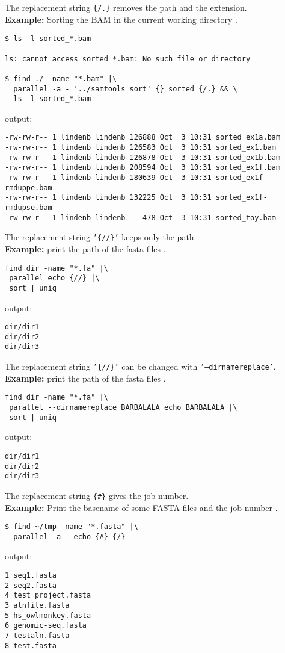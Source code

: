 \documentclass{article}
\newcommand{\example}[1]{
\textbf{Example: } {\color[rgb]{0,0,1} #1 } .
}
\begin{document}
The replacement string  \texttt{\{/.\}} removes the path and the extension.\\
\example{Sorting the BAM in the current working directory}
\begin{lstlisting}
$ ls -l sorted_*.bam

ls: cannot access sorted_*.bam: No such file or directory

$ find ./ -name "*.bam" |\
  parallel -a - '../samtools sort' {} sorted_{/.} && \
  ls -l sorted_*.bam
\end{lstlisting}
output:
\begin{lstlisting}
-rw-rw-r-- 1 lindenb lindenb 126888 Oct  3 10:31 sorted_ex1a.bam
-rw-rw-r-- 1 lindenb lindenb 126583 Oct  3 10:31 sorted_ex1.bam
-rw-rw-r-- 1 lindenb lindenb 126878 Oct  3 10:31 sorted_ex1b.bam
-rw-rw-r-- 1 lindenb lindenb 208594 Oct  3 10:31 sorted_ex1f.bam
-rw-rw-r-- 1 lindenb lindenb 180639 Oct  3 10:31 sorted_ex1f-rmduppe.bam
-rw-rw-r-- 1 lindenb lindenb 132225 Oct  3 10:31 sorted_ex1f-rmdupse.bam
-rw-rw-r-- 1 lindenb lindenb    478 Oct  3 10:31 sorted_toy.bam
\end{lstlisting}


The replacement string \texttt{'\{//\}'} keeps only the path.\\
\example{print the path of the fasta files}
\begin{lstlisting}
find dir -name "*.fa" |\
 parallel echo {//} |\
 sort | uniq
\end{lstlisting}
output:
\begin{lstlisting}
dir/dir1
dir/dir2
dir/dir3
\end{lstlisting}
The replacement string \texttt{'\{//\}'} can be changed with  \texttt{'--dirnamereplace'}.\\
\example{print the path of the fasta files}
\begin{lstlisting}
find dir -name "*.fa" |\
 parallel --dirnamereplace BARBALALA echo BARBALALA |\
 sort | uniq
\end{lstlisting}
output:
\begin{lstlisting}
dir/dir1
dir/dir2
dir/dir3
\end{lstlisting}


The replacement string \texttt{\{\#\}} gives the job number.\\
\example{Print the basename of some FASTA files and the job number}
\begin{lstlisting}
$ find ~/tmp -name "*.fasta" |\
  parallel -a - echo {#} {/}
\end{lstlisting}
output:
\begin{lstlisting}
1 seq1.fasta
2 seq2.fasta
4 test_project.fasta
3 alnfile.fasta
5 hs_owlmonkey.fasta
6 genomic-seq.fasta
7 testaln.fasta
8 test.fasta
\end{lstlisting}
\end{document}
